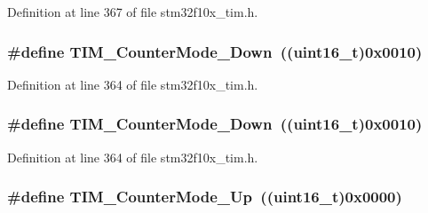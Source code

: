 Definition at line 367 of file stm32f10x\+\_\+tim.\+h.

\subsubsection[{\texorpdfstring{T\+I\+M\+\_\+\+Counter\+Mode\+\_\+\+Down}{TIM_CounterMode_Down}}]{\setlength{\rightskip}{0pt plus 5cm}\#define T\+I\+M\+\_\+\+Counter\+Mode\+\_\+\+Down~(({\bf uint16\+\_\+t})0x0010)}\hypertarget{group___t_i_m___counter___mode_gadd7c4200d185bdcd9e64ae80e6b200b0}{}\label{group___t_i_m___counter___mode_gadd7c4200d185bdcd9e64ae80e6b200b0}


Definition at line 364 of file stm32f10x\+\_\+tim.\+h.

\subsubsection[{\texorpdfstring{T\+I\+M\+\_\+\+Counter\+Mode\+\_\+\+Down}{TIM_CounterMode_Down}}]{\setlength{\rightskip}{0pt plus 5cm}\#define T\+I\+M\+\_\+\+Counter\+Mode\+\_\+\+Down~(({\bf uint16\+\_\+t})0x0010)}\hypertarget{group___t_i_m___counter___mode_gadd7c4200d185bdcd9e64ae80e6b200b0}{}\label{group___t_i_m___counter___mode_gadd7c4200d185bdcd9e64ae80e6b200b0}


Definition at line 364 of file stm32f10x\+\_\+tim.\+h.

\subsubsection[{\texorpdfstring{T\+I\+M\+\_\+\+Counter\+Mode\+\_\+\+Up}{TIM_CounterMode_Up}}]{\setlength{\rightskip}{0pt plus 5cm}\#define T\+I\+M\+\_\+\+Counter\+Mode\+\_\+\+Up~(({\bf uint16\+\_\+t})0x0000)}\hypertarget{group___t_i_m___counter___mode_gaf4cd3ce74af3122507b77c8f6e79c832}{}\label{group___t_i_m___counter___mode_gaf4cd3ce74af3122507b77c8f6e79c832}


